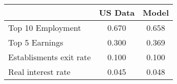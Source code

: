  \begin{tabular}{lcc} \hline 
  & US Data & Model \\ 
 \hline 
Top 10 Employment  &    0.670 &    0.658 \\ 
Top 5 Earnings  &    0.300 &    0.369 \\ 
Establisments exit rate  &    0.100 &    0.100 \\ 
Real interest rate  &    0.045 &    0.048 \\ 
\hline 
 \end{tabular} 
